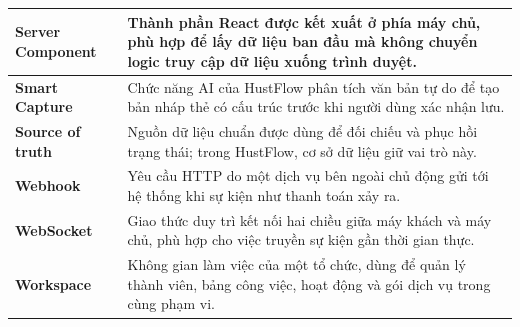 \documentclass[../DoAn.tex]{subfiles}
\begin{document}
\begin{longtable}{|p{4.2cm}|p{9.7cm}|}
    \textbf{Server Component} & Thành phần React được kết xuất ở phía máy chủ, phù hợp để lấy dữ liệu ban đầu mà không chuyển logic truy cập dữ liệu xuống trình duyệt. \\ \hline
    \textbf{Smart Capture} & Chức năng AI của HustFlow phân tích văn bản tự do để tạo bản nháp thẻ có cấu trúc trước khi người dùng xác nhận lưu. \\ \hline
    \textbf{Source of truth} & Nguồn dữ liệu chuẩn được dùng để đối chiếu và phục hồi trạng thái; trong HustFlow, cơ sở dữ liệu giữ vai trò này. \\ \hline
    \textbf{Webhook} & Yêu cầu HTTP do một dịch vụ bên ngoài chủ động gửi tới hệ thống khi sự kiện như thanh toán xảy ra. \\ \hline
    \textbf{WebSocket} & Giao thức duy trì kết nối hai chiều giữa máy khách và máy chủ, phù hợp cho việc truyền sự kiện gần thời gian thực. \\ \hline
    \textbf{Workspace} & Không gian làm việc của một tổ chức, dùng để quản lý thành viên, bảng công việc, hoạt động và gói dịch vụ trong cùng phạm vi. \\ \hline
\end{longtable}
\endgroup
\end{document}

